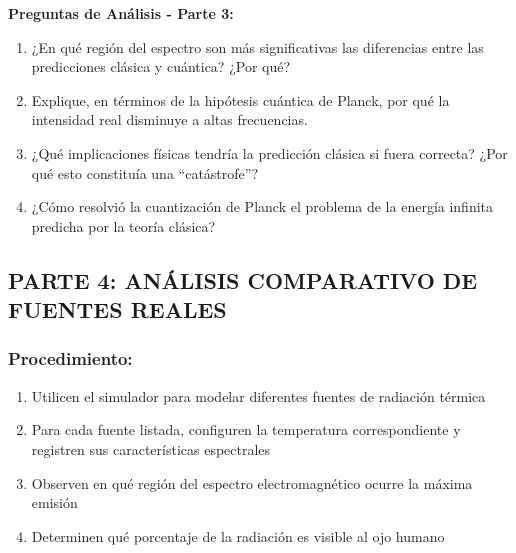 \documentclass[12pt,a4paper]{article}
\begin{document}
	\begin{preguntabox}
		\textbf{Preguntas de Análisis - Parte 3:}
		\begin{enumerate}
			\item ¿En qué región del espectro son más significativas las diferencias entre las predicciones clásica y cuántica? ¿Por qué?
			
			\vspace{1.5cm}
			
			\item Explique, en términos de la hipótesis cuántica de Planck, por qué la intensidad real disminuye a altas frecuencias.
			
			\vspace{1.5cm}
			
			\item ¿Qué implicaciones físicas tendría la predicción clásica si fuera correcta? ¿Por qué esto constituía una ``catástrofe''?
			
			\vspace{1.5cm}
			
			\item ¿Cómo resolvió la cuantización de Planck el problema de la energía infinita predicha por la teoría clásica?
			
			\vspace{1.5cm}
		\end{enumerate}
	\end{preguntabox}
	
	
	\subsection{PARTE 4: ANÁLISIS COMPARATIVO DE FUENTES REALES}
	
	\subsubsection{Procedimiento:}
	\begin{enumerate}
		\item Utilicen el simulador para modelar diferentes fuentes de radiación térmica
		\item Para cada fuente listada, configuren la temperatura correspondiente y registren sus características espectrales
		\item Observen en qué región del espectro electromagnético ocurre la máxima emisión
		\item Determinen qué porcentaje de la radiación es visible al ojo humano
	\end{enumerate}
	
\end{document}
